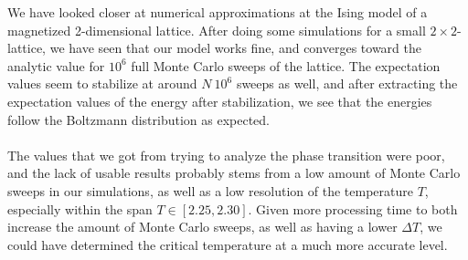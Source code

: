 \documentclass[reprint,english,notitlepage]{revtex4-1}  %
\begin{document}
We have looked closer at numerical approximations at the Ising model of a magnetized 2-dimensional lattice. After doing some simulations for a small $2\times2$-lattice, we have seen that our model works fine, and converges toward the analytic value for $10^6$ full Monte Carlo sweeps of the lattice. The expectation values seem to stabilize at around $N ~ 10^6$ sweeps as well, and after extracting the expectation values of the energy after stabilization, we see that the energies follow the Boltzmann distribution as expected.
\\
\\
The values that we got from trying to analyze the phase transition were poor, and the lack of usable results probably stems from a low amount of Monte Carlo sweeps in our simulations, as well as a low resolution of the temperature $T$, especially within the span $T \in [2.25,2.30]$. Given more processing time to both increase the amount of Monte Carlo sweeps, as well as having a lower $\Delta T$, we could have determined the critical temperature at a much more accurate level.

\newpage
\end{document}
